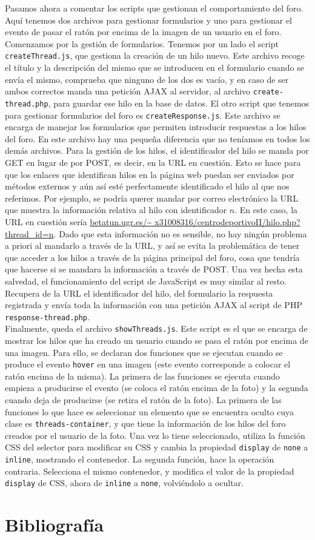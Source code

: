 \documentclass[11pt]{article}
\theoremstyle{plain}
\theoremstyle{definition}
\begin{document}
Pasamos ahora a comentar los scripts que gestionan el comportamiento
del foro. Aquí tenemos dos archivos para gestionar formularios y uno
para gestionar el evento de pasar el ratón por encima de la imagen de
un usuario en el foro. Comenzamos por la gestión de formularios.
Tenemos por un lado el script \texttt{createThread.js}, que gestiona
la creación de un hilo nuevo. Este archivo recoge el título y la
descripción del mismo que se introducen en el formulario cuando se
envía el mismo, comprueba que ninguno de los dos es vacío, y en caso
de ser ambos correctos manda una petición AJAX al servidor, al archivo
\texttt{create-thread.php}, para guardar ese hilo en la base de datos.
El otro script que tenemos para gestionar formularios del foro es
\texttt{createResponse.js}. Este archivo se encarga de manejar los
formularios que permiten introducir respuestas a los hilos del foro.
En este archivo hay una pequeña diferencia que no teníamos en todos
los demás archivos. Para la gestión de los hilos, el identificador del
hilo se manda por GET en lugar de por POST, es decir, en la URL en
cuestión. Esto se hace para que los enlaces que identifican hilos en
la página web puedan ser enviados por métodos externos y aún así esté
perfectamente identificado el hilo al que nos referimos. Por ejemplo,
se podría querer mandar por correo electrónico la URL que muestra la
información relativa al hilo con identificador $n$. En este caso, la
URL en cuestión sería \url{betatun.ugr.es/\~
  x31008316/centrodeportivoII/hilo.php?thread\_id=n}.  Dado que esta
información no es sensible, no hay ningún problema a priori al
mandarlo a través de la URL, y así se evita la problemática de tener
que acceder a los hilos a través de la página principal del foro, cosa
que tendría que hacerse si se mandara la información a través de
POST. Una vez hecha esta salvedad, el funcionamiento del script de
JavaScript es muy similar al resto. Recupera de la URL el
identificador del hilo, del formulario la respuesta registrada y envía
toda la información con una petición AJAX al script de PHP
\texttt{response-thread.php}.\\

Finalmente, queda el archivo \texttt{showThreads.js}. Este script es
el que se encarga de mostrar los hilos que ha creado un usuario cuando
se pasa el ratón por encima de una imagen. Para ello, se declaran dos
funciones que se ejecutan cuando se produce el evento \texttt{hover}
en una imagen (este evento corresponde a colocar el ratón encima de la
misma). La primera de las funciones se ejecuta cuando empieza a
producirse el evento (se coloca el ratón encima de la foto) y la
segunda cuando deja de producirse (se retira el ratón de la foto). La
primera de las funciones lo que hace es seleccionar un elemento que se
encuentra oculto cuya clase es \texttt{threads-container}, y que tiene
la información de los hilos del foro creados por el usuario de la
foto. Una vez lo tiene seleccionado, utiliza la función CSS del
selector para modificar su CSS y cambia la propiedad \texttt{display}
de \texttt{none} a \texttt{inline}, mostrando el contenedor. La
segunda función, hace la operación contraria. Selecciona el mismo
contenedor, y modifica el valor de la propiedad \texttt{display} de
CSS, ahora de \texttt{inline} a \texttt{none}, volviéndolo a ocultar.

\section{Bibliografía}

\nocite{*}
\printbibliography
\end{document}
